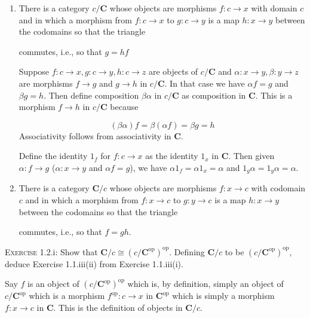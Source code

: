 \documentclass{article}
\begin{document}
\begin{enumerate}
\item There is a category \(c/\mathbf{C}\) whose objects are morphisms \(f:c→x\) with domain \(c\) and in which a morphism from \(f:c\to x\) to \(g:c\to y\) is a map \(h:x\to y\) between the codomains so that the triangle
\begin{center}
\end{center}
commutes, i.e., so that \(g=hf\)

Suppose \(f:c→x, g:c→y, h:c→z\) are objects of \(c/\mathbf{C}\) and \(α:x→y, β:y→z\) are morphisms \(f→g\) and \(g→h\) in \(c/\mathbf{C}\). In that case we have \(αf = g\) and \(βg = h\). Then define composition \(βα\) in \(c/\mathbf{C}\) as composition in \(\mathbf{C}\). This is a morphism \(f→h\) in \(c/\mathbf{C}\) because

\begin{equation*}
(βα)f = β(αf) = βg = h
\end{equation*}
Associativity follows from associativity in \(\mathbf{C}\).

Define the identity \(1_f\) for \(f:c→x\) as the identity \(1_x\) in \(\mathbf{C}\). Then given \(α:f→g\) (\(α:x→y\) and \(αf=g\)), we have \(α1_f=α1_x=α\) and \(1_gα=1_yα=α\). 

\item There is a category \(\mathbf{C}/c\) whose objects are morphisms \(f:x→c\) with codomain \(c\) and in which a morphism from \(f:x→c\) to \(g:y→c\) is a map \(h:x\to y\) between the codomains so that the triangle
\begin{center}
\end{center}
commutes, i.e., so that \(f=gh\).
\end{enumerate}

\noindent
\textsc{Exercise} 1.2.i: Show that \(\mathbf{C}/c≅(c/\mathbf{C}^\textrm{op})^\textrm{op}\). Defining \(\mathbf{C}/c\) to be \((c/\mathbf{C}^\textrm{op})^\textrm{op}\), deduce Exercise 1.1.iii(ii) from Exercise 1.1.iii(i).

Say \(f\) is an object of \((c/\mathbf{C}^\textrm{op})^\textrm{op}\) which is, by definition, simply an object of \(c/\mathbf{C}^\textrm{op}\) which is a morphism \(f^\textrm{op}:c→x\) in \(\mathbf{C}^\textrm{op}\) which is simply a morphism \(f:x→c\) in \(\mathbf{C}\). This is the definition of objects in \(\mathbf{C}/c\).
\end{document}
